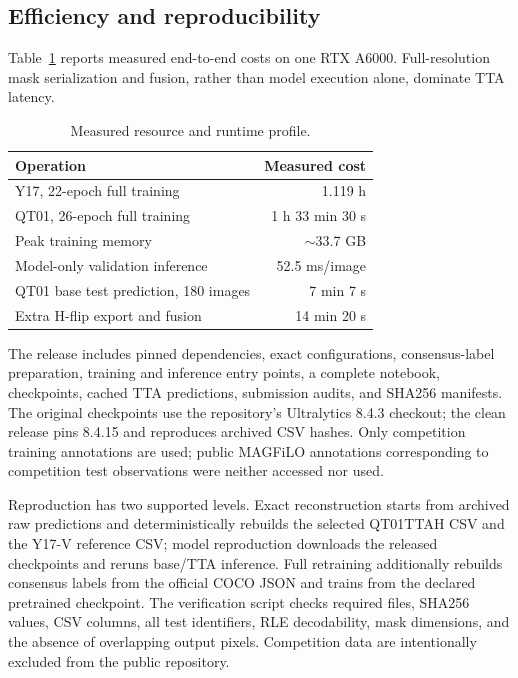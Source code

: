 \documentclass[sigconf]{acmart}
\begin{document}
\subsection{Efficiency and reproducibility}
Table~\ref{tab:efficiency} reports measured end-to-end costs on one RTX A6000. Full-resolution mask
serialization and fusion, rather than model execution alone, dominate TTA latency.

\begin{table}[!h]
\centering
\caption{Measured resource and runtime profile.}
\label{tab:efficiency}
\small
\begin{tabular}{lr}
\toprule
Operation & Measured cost \\
\midrule
Y17, 22-epoch full training & 1.119 h \\
QT01, 26-epoch full training & 1 h 33 min 30 s \\
Peak training memory & $\sim$33.7 GB \\
Model-only validation inference & 52.5 ms/image \\
QT01 base test prediction, 180 images & 7 min 7 s \\
Extra H-flip export and fusion & 14 min 20 s \\
\bottomrule
\end{tabular}
\end{table}

The release includes pinned dependencies, exact configurations, consensus-label preparation,
training and inference entry points, a complete notebook, checkpoints, cached TTA predictions,
submission audits, and SHA256 manifests. The original checkpoints use the repository's
Ultralytics 8.4.3 checkout; the clean release pins 8.4.15 and reproduces archived CSV hashes. Only
competition training annotations are used; public MAGFiLO annotations corresponding to competition
test observations were neither accessed nor used.

Reproduction has two supported levels. Exact reconstruction starts from archived raw predictions
and deterministically rebuilds the selected QT01TTAH CSV and the Y17-V reference CSV; model reproduction downloads the released
checkpoints and reruns base/TTA inference. Full retraining additionally rebuilds consensus labels
from the official COCO JSON and trains from the declared pretrained checkpoint. The verification
script checks required files, SHA256 values, CSV columns, all test identifiers, RLE decodability,
mask dimensions, and the absence of overlapping output pixels. Competition data are intentionally
excluded from the public repository.
\end{document}

